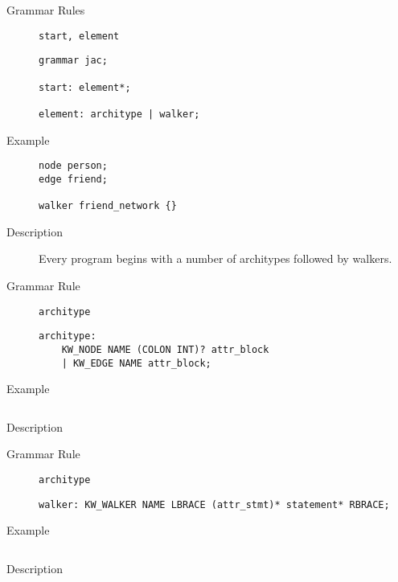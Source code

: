 \begin{description}
    \item[Grammar Rules] \texttt{start, element}
          \begin{lstlisting}[style=gram]
grammar jac;

start: element*;

element: architype | walker;

        \end{lstlisting}
    \item[Example] \texttt{}
          \begin{lstlisting}
node person;
edge friend;

walker friend_network {}
        \end{lstlisting}

    \item[Description] Every program begins with a number of architypes followed by walkers.
\end{description}


\begin{description}
    \item[Grammar Rule] \texttt{architype}
          \begin{lstlisting}[style=gram]
architype:
    KW_NODE NAME (COLON INT)? attr_block
    | KW_EDGE NAME attr_block;
        \end{lstlisting}
    \item[Example] \texttt{}
          \begin{lstlisting}
        \end{lstlisting}

    \item[Description]
\end{description}


\begin{description}
    \item[Grammar Rule] \texttt{architype}
          \begin{lstlisting}[style=gram]
walker: KW_WALKER NAME LBRACE (attr_stmt)* statement* RBRACE;
        \end{lstlisting}
    \item[Example] \texttt{}
          \begin{lstlisting}
        \end{lstlisting}

    \item[Description]
\end{description}


